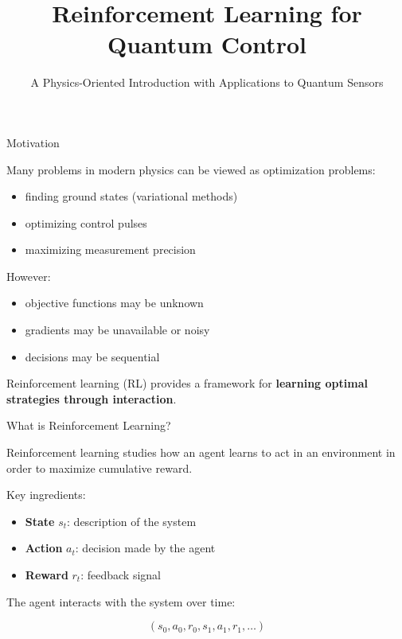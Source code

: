 \documentclass{beamer}
\title{Reinforcement Learning for Quantum Control}
\subtitle{A Physics-Oriented Introduction with Applications to Quantum Sensors}
\author{}
\date{}
\begin{document}
\frame{\titlepage}

\begin{frame}{Motivation}

Many problems in modern physics can be viewed as optimization problems:

\begin{itemize}
\item finding ground states (variational methods)
\item optimizing control pulses
\item maximizing measurement precision
\end{itemize}

However:

\begin{itemize}
\item objective functions may be unknown
\item gradients may be unavailable or noisy
\item decisions may be sequential
\end{itemize}

Reinforcement learning (RL) provides a framework for
\textbf{learning optimal strategies through interaction}.

\end{frame}

\begin{frame}{What is Reinforcement Learning?}

Reinforcement learning studies how an agent learns to act
in an environment in order to maximize cumulative reward.

Key ingredients:

\begin{itemize}
\item \textbf{State} $s_t$: description of the system
\item \textbf{Action} $a_t$: decision made by the agent
\item \textbf{Reward} $r_t$: feedback signal
\end{itemize}

The agent interacts with the system over time:

\[
(s_0,a_0,r_0,s_1,a_1,r_1,\dots)
\]

\end{frame}
\end{document}
